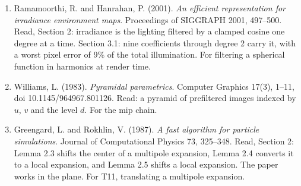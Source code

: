 \begin{enumerate}
  \item Ramamoorthi, R. and Hanrahan, P. (2001). \emph{An efficient representation for irradiance environment maps}. Proceedings of SIGGRAPH 2001, 497--500. Read, Section 2: irradiance is the lighting filtered by a clamped cosine one degree at a time. Section 3.1: nine coefficients through degree 2 carry it, with a worst pixel error of 9\% of the total illumination. For filtering a spherical function in harmonics at render time.
  \item Williams, L. (1983). \emph{Pyramidal parametrics}. Computer Graphics 17(3), 1--11, doi 10.1145/964967.801126. Read: a pyramid of prefiltered images indexed by \(u\), \(v\) and the level \(d\). For the mip chain.
  \item Greengard, L. and Rokhlin, V. (1987). \emph{A fast algorithm for particle simulations}. Journal of Computational Physics 73, 325--348. Read, Section 2: Lemma 2.3 shifts the center of a multipole expansion, Lemma 2.4 converts it to a local expansion, and Lemma 2.5 shifts a local expansion. The paper works in the plane. For T11, translating a multipole expansion.
\end{enumerate}
